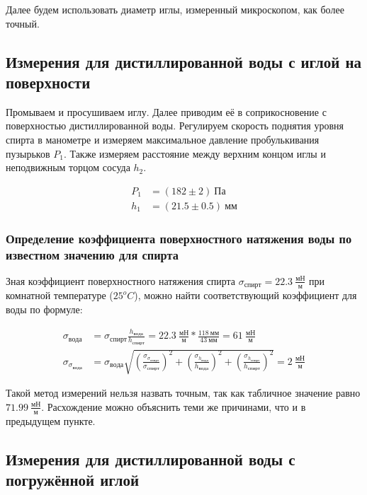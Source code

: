 \documentclass[a4paper, 12pt]{article}
\begin{document}
			Далее будем использовать диаметр иглы, измеренный микроскопом, как более точный.

		\subsection{Измерения для дистиллированной воды с иглой на поверхности}

			Промываем и просушиваем иглу. Далее приводим её в соприкосновение с поверхностью дистиллированной воды. Регулируем скорость поднятия уровня спирта в манометре и измеряем максимальное давление пробулькивания пузырьков $P_1$. Также измеряем расстояние между верхним концом иглы и неподвижным торцом сосуда $h_2$.

			\begin{align*}
				P_1 &= (182 \pm 2)~Па\\
				h_1 &= (21.5 \pm 0.5)~мм
			\end{align*}

			\subsubsection{Определение коэффициента поверхностного натяжения воды по известном значению для спирта}

				Зная коэффициент поверхностного натяжения спирта $\sigma_{спирт} = 22.3~\frac{мН}{м}$ при комнатной температуре ($25^oC$), можно найти соответствующий коэффициент для воды по формуле:

				\begin{align*}
					\sigma_{вода} &= \sigma_{спирт} \frac{h_{вода}}{h_{спирт}} = 22.3~\frac{мН}{м} * \frac{118~мм}{43~мм} = 61~\frac{мН}{м}\\
					\sigma_{\sigma_{вода}} &= \sigma_{вода} \sqrt{\left( \frac{\sigma_{\sigma_{спирт}}}{\sigma_{спирт}} \right)^2 + \left( \frac{\sigma_{h_{вода}}}{h_{вода}} \right)^2 + \left( \frac{\sigma_{h_{спирт}}}{h_{спирт}} \right)^2} = 2~\frac{мН}{м}
				\end{align*}

				Такой метод измерений нельзя назвать точным, так как табличное значение равно $71.99~\frac{мН}{м}$. Расхождение можно объяснить теми же причинами, что и в предыдущем пункте.

		\subsection{Измерения для дистиллированной воды с погружённой иглой}
\end{document}
